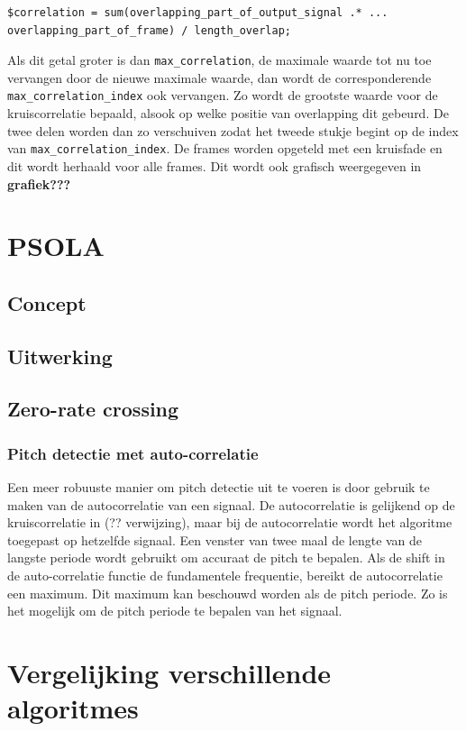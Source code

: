 \documentclass[12pt]{report}
\begin{document}
\begin{verbatim}
$correlation = sum(overlapping_part_of_output_signal .* ...
overlapping_part_of_frame) / length_overlap;
\end{verbatim}

Als dit getal groter is dan \verb|max_correlation|, de maximale waarde tot nu toe  vervangen door de nieuwe maximale waarde, dan wordt de corresponderende \verb|max_correlation_index| ook vervangen.
Zo wordt de grootste waarde voor de kruiscorrelatie bepaald, alsook op welke positie van overlapping dit gebeurd. De twee delen worden dan zo verschuiven zodat het tweede stukje begint op de index van \verb|max_correlation_index|. De frames worden opgeteld met een kruisfade en dit wordt herhaald voor alle frames. Dit wordt ook grafisch weergegeven in \textbf{grafiek???}

\section{PSOLA}
\subsection{Concept}
\subsection{Uitwerking}
\subsection{Zero-rate crossing}
\subsubsection{Pitch detectie met auto-correlatie}
Een meer robuuste manier om pitch detectie uit te voeren is door gebruik te maken van de autocorrelatie van een signaal. De autocorrelatie is gelijkend op de kruiscorrelatie in (?? verwijzing), maar bij de autocorrelatie wordt het algoritme toegepast op hetzelfde signaal. 
Een venster van twee maal de lengte van de langste periode wordt  gebruikt om accuraat de pitch te bepalen. Als de shift in de auto-correlatie functie de fundamentele frequentie, bereikt de autocorrelatie een maximum. Dit maximum kan beschouwd worden als de pitch periode. Zo is het mogelijk om de pitch periode te bepalen van het signaal. 


\section{Vergelijking verschillende algoritmes}
\end{document}
